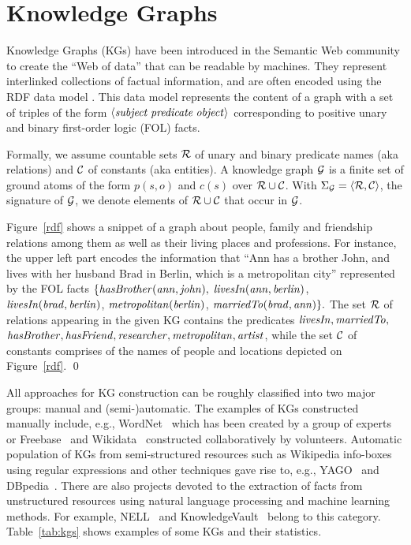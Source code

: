 \section{Knowledge Graphs}
\label{sec:kgs}

Knowledge Graphs (KGs) have been introduced in the Semantic Web community to create the ``Web of data'' that can be readable by machines. They represent interlinked collections of factual information, and are often encoded using the RDF data model \cite{rdf2004}. This data model represents the content of a graph with a set of triples of the form $\langle\mathit{subject\;predicate\;object}\rangle$ corresponding to positive unary and binary first-order logic (FOL) facts.  

Formally, we assume countable sets $\mathcal{R}$ of unary and binary predicate names (aka relations) and $\mathcal{C}$ of constants (aka entities). A knowledge graph $\mathcal{G}$ is a finite set of ground atoms of the form $p(s,o)$ and $c(s)$ over $\mathcal{R} \cup \mathcal{C}$. With $\Sigma_{\mathcal{G}}=\langle\mathcal{R},\mathcal{C}\rangle$, the signature of $\mathcal{G}$, we denote elements of $\mathcal{R} \cup \mathcal{C}$ that occur in $\mathcal{G}$.

\begin{example} Figure~\ref{rdf} shows a snippet of a graph about people, family and friendship %
relations among them as well as their living places and professions. For instance, the upper left part encodes the information that ``Ann has a brother John, and lives with her husband Brad in Berlin, which is a metropolitan city'' represented by the FOL facts $\{\mathit{hasBrother(ann, john),}$ $\mathit{ livesIn(ann, berlin)}$, \\$\mathit{livesIn(brad, berlin)}$, $\mathit{metropolitan(berlin)}$, $\mathit{marriedTo(brad, ann)}\}.$
The set $\mathcal{R}$ of relations appearing in the given KG contains the predicates $\mathit{livesIn,marriedTo,}$\\$\mathit{hasBrother,hasFriend,researcher,metropolitan,artist}$, while the set $\mathcal{C}$ of constants comprises of the names of people and locations depicted on Figure~\ref{rdf}. \qed
\end{example}



All approaches for KG construction can be roughly classified into two major groups: manual and (semi-)automatic. The examples of KGs constructed manually include, e.g., WordNet~\cite{wordnet} which has been created by a group of experts or Freebase~\cite{Freebase} and Wikidata~\cite{wikidata} constructed collaboratively by volunteers. 
Automatic population of KGs from semi-structured resources such as Wikipedia info-boxes using regular expressions and other techniques gave rise to, e.g., YAGO~\cite{yago} and DBpedia~\cite{dbpedia}. 
There are also projects 
devoted to the extraction of facts from unstructured resources using natural language processing and machine learning methods.  
For example, NELL~\cite{nell} and KnowledgeVault~\cite{KnowledgeVault} belong to this category. Table~\ref{tab:kgs} shows examples of some KGs and their statistics.

